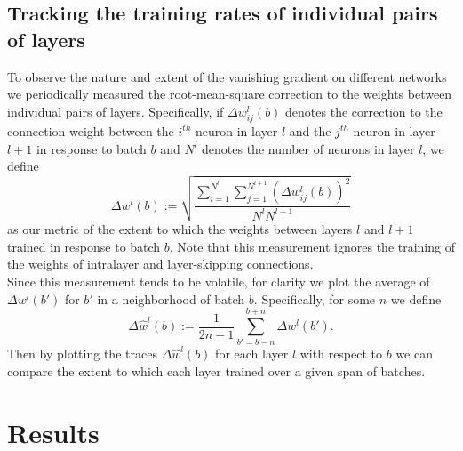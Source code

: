 \documentclass{article}
\newcommand{\npar}{\\\indent}
\begin{document}
\subsection{Tracking the training rates of individual pairs of layers}

To observe the nature and extent of the vanishing gradient on different networks we periodically measured the root-mean-square correction to the weights between individual pairs of layers. Specifically, if $\Delta w_{ij}^l(b)$ denotes the correction to the connection weight between the $i^{th}$ neuron in layer $l$ and the $j^{th}$ neuron in layer $l+1$ in response to batch $b$ and $N^l$ denotes the number of neurons in layer $l$, we define
\begin{equation}
\label{eqn:rms_correction}
\Delta w^l(b):=\sqrt{\frac{\sum_{i=1}^{N^l}\sum_{j=1}^{N^{l+1}}(\Delta w_{ij}^l(b))^2}{N^lN^{l+1}}}
\end{equation}
as our metric of the extent to which the weights between layers $l$ and $l+1$ trained in response to batch $b$. Note that this measurement ignores the training of the weights of intralayer and layer-skipping connections.
\npar
Since this measurement tends to be volatile, for clarity we plot the average of $\Delta w^l(b')$ for $b'$ in a neighborhood of batch $b$. Specifically, for some $n$ we define
\begin{equation}
\label{eqn:running_avg}
\Delta \hat{w}^l(b):=\frac{1}{2n+1}\sum_{b'=b-n}^{b+n}\Delta w^l(b').
\end{equation}
Then by plotting the traces $\Delta \hat{w}^l(b)$ for each layer $l$ with respect to $b$ we can compare the extent to which each layer trained over a given span of batches.

\section{Results}
\end{document}
